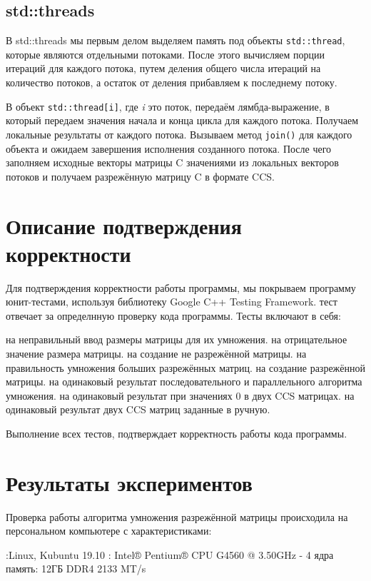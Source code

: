\documentclass[14pt,a4paper,report]{ncc}
\begin{document}
	
	\subsection*{std::threads}
	В std::threads мы первым делом выделяем память под объекты \verb|std::thread|, которые являются отдельными потоками. После этого вычисляем порции итераций для каждого потока, путем деления общего числа итераций на количество потоков, а остаток от деления прибавляем к последнему потоку.
	\par В объект \verb|std::thread[i]|, где \emph{i} это поток, передаём лямбда-выражение, в который передаем значения начала и конца цикла для каждого потока. Получаем локальные результаты от каждого потока. Вызываем метод \verb|join()| для каждого объекта и ожидаем завершения исполнения созданного потока. После чего заполняем исходные векторы матрицы C значениями из локальных векторов потоков и получаем разрежённую матрицу C в формате CCS.
	\newpage
	
	\section*{Описание подтверждения корректности}
	Для подтверждения корректности работы программы, мы покрываем программу юнит-тестами, используя библиотеку Google C++ Testing Framework.
	 тест отвечает за определнную проверку кода программы. Тесты включают в себя:
	\begin{itemize}
		 на неправильный ввод размеры матрицы для их умножения.
		 на отрицательное значение размера матрицы.
		 на создание не разрежённой матрицы.
		 на правильность умножения больших разрежённых матриц.
		 на создание разрежённой матрицы.
		 на одинаковый результат последовательного и параллельного алгоритма умножения.
		 на одинаковый результат при значениях 0 в двух CCS матрицах.
		 на одинаковый результат двух CCS матриц заданные в ручную. 
	\end{itemize}  
	
	\par Выполнение всех тестов, подтверждает корректность работы кода программы.
	\newpage
	
	\section*{Результаты экспериментов}
	\addcontentsline{toc}{section}{Результаты экспериментов}
	Проверка работы алгоритма умножения разрежённой матрицы происходила на персональном компьютере с характеристиками:
	\begin{itemize}
		:Linux, Kubuntu 19.10
		: Intel® Pentium® CPU G4560 @ 3.50GHz - 4 ядра
		 память: 12ГБ DDR4 2133 MT/s
	\end{itemize}
\end{document}
